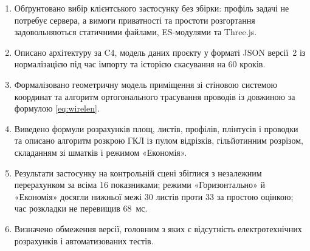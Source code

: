 \begin{enumerate}[noitemsep, topsep=0.3em, leftmargin=*, label=\arabic*.]
    \item Обґрунтовано вибір клієнтського застосунку без збірки: профіль задачі не потребує сервера, а вимоги приватності та простоти розгортання задовольняються статичними файлами, ES-модулями та Three.js.
    \item Описано архітектуру за C4, модель даних проєкту у форматі JSON версії~2 із нормалізацією під час імпорту та історією скасування на 60 кроків.
    \item Формалізовано геометричну модель приміщення зі стіновою системою координат та алгоритм ортогонального трасування проводів із довжиною за формулою \eqref{eq:wirelen}.
    \item Виведено формули розрахунків площ, листів, профілів, плінтусів і проводки та описано алгоритм розкрою ГКЛ із пулом відрізків, гільйотинним розрізом, складанням зі шматків і режимом «Економія».
    \item Результати застосунку на контрольній сцені збіглися з незалежним перерахунком за всіма 16 показниками; режими «Горизонтально» й «Економія» досягли нижньої межі 30 листів проти 33 за простою оцінкою; час розкладки не перевищив 68~мс.
    \item Визначено обмеження версії, головним з яких є відсутність електротехнічних розрахунків і автоматизованих тестів.
\end{enumerate}
